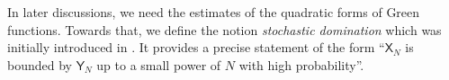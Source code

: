 \documentclass[12pt]{article}
\numberwithin{equation}{section}
\theoremstyle{remark}
\newcommand{\1}{{\rm 1}\kern-0.24em{\rm I}}
\begin{document}


In later discussions, we need the estimates of  the quadratic forms of Green functions. %
 Towards that,  we define  the notion {\it stochastic domination} which was initially  introduced in \cite{EKY2013}.  It provides a precise statement of the form ``$\textsf{X}_N$ is bounded by $\textsf{Y}_N$ up to a small power of $N$ with high probability''.



\end{document}
